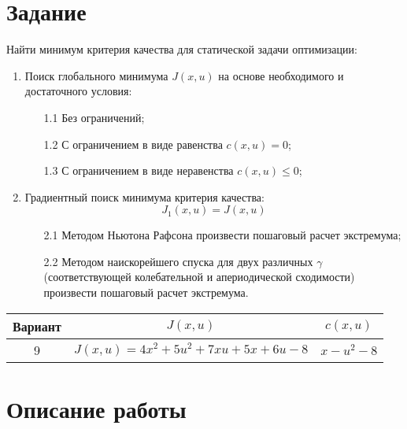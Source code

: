 \documentclass[14pt, a4paper]{extarticle}
\begin{document}
	\onehalfspacing
	
	\setcounter{page}{2}
	
	\section*{Задание}
	
	Найти минимум критерия качества для статической задачи оптимизации:
	\begin{enumerate}
		\item Поиск глобального минимума $J(x,u)$ на основе необходимого и достаточного условия:
		\begin{enumerate}
			\item[1.1] Без ограничений;
			\item[1.2] С ограничением в виде равенства $c(x,u)=0$;
			\item[1.3] С ограничением в виде неравенства $c(x,u)\le0$; 
		\end{enumerate}
		\item Градиентный поиск минимума критерия качества:
		$$J_1(x,u)=J(x,u)$$
		\begin{enumerate}
			\item[2.1] Методом Ньютона Рафсона произвести пошаговый расчет экстремума;
			\item[2.2] Методом наискорейшего спуска для двух различных $\gamma$ (соответствующей колебательной и апериодической сходимости) произвести пошаговый расчет экстремума. 
		\end{enumerate}
	\end{enumerate}
	\begin{table}[H]
		\centering
		\begin{tabular}{|c|c|c|}
			\hline
			Вариант & $J(x,u)$ & $c(x,u)$ \\\hline
			9 & $J(x,u)=4x^2+5u^2+7xu+5x+6u-8$ & $x-u^2-8$ \\\hline
		\end{tabular}
	\end{table}
	
	\newpage
	
	\section*{Описание работы}
	
\end{document}
